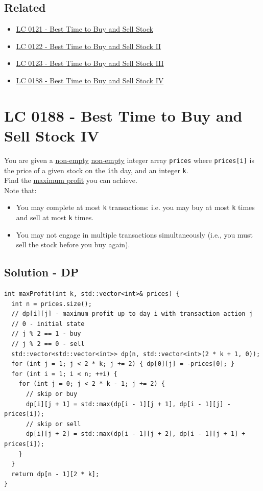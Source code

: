\subsection*{Related}
\begin{itemize}
	\item \hyperref[lc0121]{LC 0121 - Best Time to Buy and Sell Stock}
	\item \hyperref[lc0122]{LC 0122 - Best Time to Buy and Sell Stock II}
	\item \hyperref[lc0123]{LC 0123 - Best Time to Buy and Sell Stock III}
	\item \hyperref[lc0188]{LC 0188 - Best Time to Buy and Sell Stock IV}
\end{itemize}

\section{LC 0188 - Best Time to Buy and Sell Stock IV}\label{lc0188}
You are given a \ul{non-empty} \ul{non-empty} integer array {\colorbox{CodeBackground}{\lstinline|prices|}} where {\colorbox{CodeBackground}{\lstinline|prices[i]|}} is the price of a given stock on the {\colorbox{CodeBackground}{\lstinline|i|}}th day, and an integer {\colorbox{CodeBackground}{\lstinline|k|}}.\\

Find the \ul{maximum profit} you can achieve. \\

Note that:
\begin{itemize}
	\item You may complete at most {\colorbox{CodeBackground}{\lstinline|k|}} transactions: i.e. you may buy at most {\colorbox{CodeBackground}{\lstinline|k|}} times and sell at most {\colorbox{CodeBackground}{\lstinline|k|}} times.
	\item You may not engage in multiple transactions simultaneously (i.e., you must sell the stock before you buy again).
\end{itemize}

\subsection*{Solution - DP}
\begin{lstlisting}
int maxProfit(int k, std::vector<int>& prices) {
  int n = prices.size();
  // dp[i][j] - maximum profit up to day i with transaction action j
  // 0 - initial state
  // j % 2 == 1 - buy
  // j % 2 == 0 - sell
  std::vector<std::vector<int>> dp(n, std::vector<int>(2 * k + 1, 0));
  for (int j = 1; j < 2 * k; j += 2) { dp[0][j] = -prices[0]; }
  for (int i = 1; i < n; ++i) {
    for (int j = 0; j < 2 * k - 1; j += 2) {
      // skip or buy
      dp[i][j + 1] = std::max(dp[i - 1][j + 1], dp[i - 1][j] - prices[i]);
      // skip or sell
      dp[i][j + 2] = std::max(dp[i - 1][j + 2], dp[i - 1][j + 1] + prices[i]);
    }
  }
  return dp[n - 1][2 * k];
}
\end{lstlisting}

